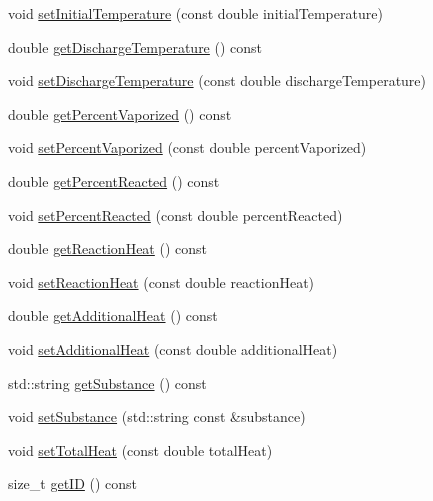 \begin{DoxyCompactItemize}
void \hyperlink{class_liquid_load_charge_material_ac30600ef82db69934e8c08e4a774bb03}{set\+Initial\+Temperature} (const double initial\+Temperature)
\item 
double \hyperlink{class_liquid_load_charge_material_ad474f33059c99aa94e1d63738e11ff0e}{get\+Discharge\+Temperature} () const
\item 
void \hyperlink{class_liquid_load_charge_material_a04ef0778e524f531b6dd2dd6137c270d}{set\+Discharge\+Temperature} (const double discharge\+Temperature)
\item 
double \hyperlink{class_liquid_load_charge_material_a8e55b0df0a0551671636bcf169228dca}{get\+Percent\+Vaporized} () const
\item 
void \hyperlink{class_liquid_load_charge_material_aaf2aa3303201370a7b79e5b3f54e135a}{set\+Percent\+Vaporized} (const double percent\+Vaporized)
\item 
double \hyperlink{class_liquid_load_charge_material_acfedb26800cbead9bf11c57e1356dd57}{get\+Percent\+Reacted} () const
\item 
void \hyperlink{class_liquid_load_charge_material_a9984b8c78a460ef3569fc3ef13eea604}{set\+Percent\+Reacted} (const double percent\+Reacted)
\item 
double \hyperlink{class_liquid_load_charge_material_a2f0c26e789e98efd1e8fd0c8741ddd92}{get\+Reaction\+Heat} () const
\item 
void \hyperlink{class_liquid_load_charge_material_a793c7ebc2643b2af0eaf21b9cb788775}{set\+Reaction\+Heat} (const double reaction\+Heat)
\item 
double \hyperlink{class_liquid_load_charge_material_a6b79cd1aec59a7f7119a8abfa9e5859b}{get\+Additional\+Heat} () const
\item 
void \hyperlink{class_liquid_load_charge_material_a557c1f588cfb972ff0c7f748d6c2bd8f}{set\+Additional\+Heat} (const double additional\+Heat)
\item 
std\+::string \hyperlink{class_liquid_load_charge_material_a8f925c04c15ed889ba3fd7c4b628dbff}{get\+Substance} () const
\item 
void \hyperlink{class_liquid_load_charge_material_a85bb43270c6a11a1eaf51f00da16746a}{set\+Substance} (std\+::string const \&substance)
\item 
void \hyperlink{class_liquid_load_charge_material_ad45afc317b72c89cc46016e0b05b50b3}{set\+Total\+Heat} (const double total\+Heat)
\item 
size\+\_\+t \hyperlink{class_liquid_load_charge_material_a07e869cabd98a5179536559a1c0f4b35}{get\+ID} () const

\end{DoxyCompactItemize}
